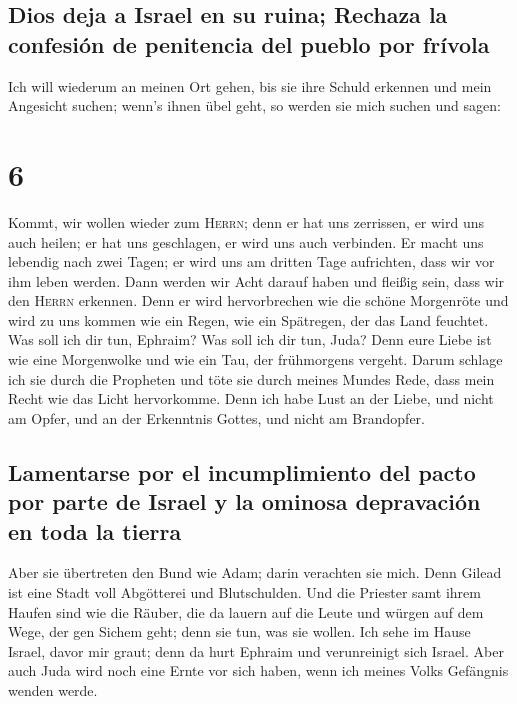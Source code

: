 \hypertarget{dios-deja-a-israel-en-su-ruina-rechaza-la-confesiuxf3n-de-penitencia-del-pueblo-por-fruxedvola}{%
\subsection{Dios deja a Israel en su ruina; Rechaza la confesión de
penitencia del pueblo por
frívola}\label{dios-deja-a-israel-en-su-ruina-rechaza-la-confesiuxf3n-de-penitencia-del-pueblo-por-fruxedvola}}

 Ich will wiederum an meinen Ort gehen, bis sie ihre
Schuld erkennen und mein Angesicht suchen; wenn's ihnen übel geht, so
werden sie mich suchen und sagen:

\hypertarget{section-5}{%
\section{6}\label{section-5}}

 Kommt, wir wollen wieder zum \textsc{Herrn}; denn er hat
uns zerrissen, er wird uns auch heilen; er hat uns geschlagen, er wird
uns auch verbinden.  Er macht uns lebendig nach zwei
Tagen; er wird uns am dritten Tage aufrichten, dass wir vor ihm leben
werden.  Dann werden wir Acht darauf haben und fleißig
sein, dass wir den \textsc{Herrn} erkennen. Denn er wird hervorbrechen
wie die schöne Morgenröte und wird zu uns kommen wie ein Regen, wie ein
Spätregen, der das Land feuchtet.  Was soll ich dir tun,
Ephraim? Was soll ich dir tun, Juda? Denn eure Liebe ist wie eine
Morgenwolke und wie ein Tau, der frühmorgens vergeht. 
Darum schlage ich sie durch die Propheten und töte sie durch meines
Mundes Rede, dass mein Recht wie das Licht hervorkomme. 
Denn ich habe Lust an der Liebe, und nicht am Opfer, und an der
Erkenntnis Gottes, und nicht am Brandopfer.

\hypertarget{lamentarse-por-el-incumplimiento-del-pacto-por-parte-de-israel-y-la-ominosa-depravaciuxf3n-en-toda-la-tierra}{%
\subsection{Lamentarse por el incumplimiento del pacto por parte de
Israel y la ominosa depravación en toda la
tierra}\label{lamentarse-por-el-incumplimiento-del-pacto-por-parte-de-israel-y-la-ominosa-depravaciuxf3n-en-toda-la-tierra}}

 Aber sie übertreten den Bund wie Adam; darin verachten
sie mich.  Denn Gilead ist eine Stadt voll Abgötterei und
Blutschulden.  Und die Priester samt ihrem Haufen sind wie
die Räuber, die da lauern auf die Leute und würgen auf dem Wege, der gen
Sichem geht; denn sie tun, was sie wollen.  Ich sehe im
Hause Israel, davor mir graut; denn da hurt Ephraim und verunreinigt
sich Israel.  Aber auch Juda wird noch eine Ernte vor
sich haben, wenn ich meines Volks Gefängnis wenden werde.

